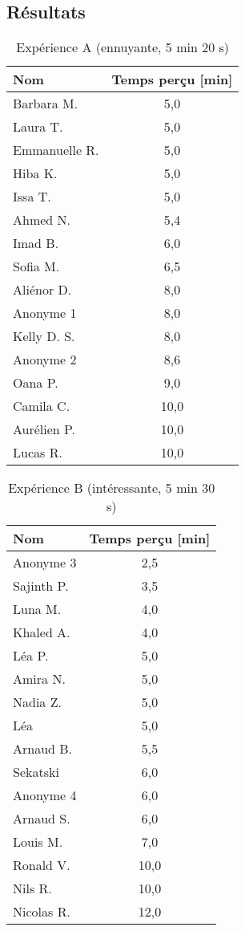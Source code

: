 \documentclass[12pt,fleqn,oneside,openany]{book} %
\begin{document}

\subsection{Résultats} \label{ssec:resultats1}

\begin{table}[h]
	\centering
	\caption{Expérience A (ennuyante, 5 min 20 s)} \label{tbl:exp1.1A}
	\begin{tabular}{lc}
		\toprule 
		\textbf{Nom} & \textbf{Temps perçu} \textbf{[min]}\\ \midrule
		Barbara M. & 5,0 \\
		Laura T. & 5,0 \\
		Emmanuelle R. & 5,0 \\
		Hiba K. & 5,0 \\
		Issa T. & 5,0 \\
		Ahmed N. & 5,4 \\
		Imad B. & 6,0 \\
		Sofia M. & 6,5 \\
		Aliénor D. & 8,0 \\
		Anonyme 1 & 8,0 \\
		Kelly D. S. & 8,0 \\
		Anonyme 2 & 8,6 \\
		Oana P. & 9,0 \\
		Camila C. & 10,0 \\
		Aurélien P. & 10,0 \\
		Lucas R. & 10,0 \\ \bottomrule
	\end{tabular}
\end{table}

\begin{table}[h]
	\centering
	\caption{Expérience B (intéressante, 5 min 30 s)} \label{tbl:exp1.1B}
	\begin{tabular}{lc}
		\toprule
		\textbf{Nom} & \textbf{Temps perçu [min]} \\ \midrule
		Anonyme 3 & 2,5 \\
		Sajinth P. & 3,5 \\
		Luna M. & 4,0 \\
		Khaled A. & 4,0 \\
		Léa P. & 5,0 \\
		Amira N. & 5,0 \\
		Nadia Z. & 5,0 \\
		Léa & 5,0 \\
		Arnaud B. & 5,5 \\
		Sekatski & 6,0 \\
		Anonyme 4 & 6,0 \\
		Arnaud S. & 6,0 \\
		Louis M. & 7,0 \\
		Ronald V. & 10,0 \\
		Nils R. & 10,0 \\
		Nicolas R. & 12,0 \\ \bottomrule
	\end{tabular}
\end{table}
\end{document}
